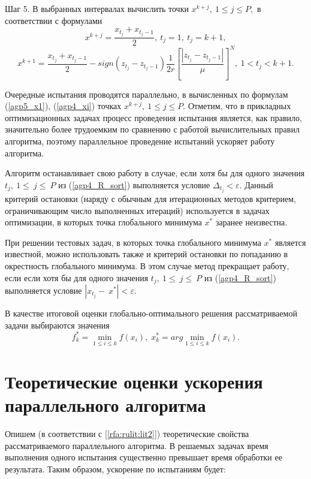 \documentclass[10pt,a4paper]{book}
\begin{document}
Шаг 5. В выбранных интервалах вычислить точки $x^{k+j},\ 1\leq j\leq P,$ в соответствии с формулами
\begin{equation}
\label{agp5_x1}
	x^{k+j}=\frac{x_{t_j}+x_{t_j-1}}{2},\ t_j=1,\ t_j=k+1,
\end{equation}	
	\begin{equation}
\label{agp4_xi}	
	x^{k+1}=\frac{x_{t_j}+x_{t_j-1}}{2}-sign\left(z_{t_j}-z_{t_j-1}\right)\frac{1}{2r}\left[\frac{\left|z_{t_j}-z_{t_j-1}\right|}{\mu}\right]^N,\ 1<t_j<k+1.
\end{equation}	

Очередные испытания проводятся параллельно, в вычисленных по формулам (\ref{agp5_x1}), (\ref{agp4_xi}) точках $x^{k+j},\ 1\leq j\leq P$.
Отметим, что в прикладных оптимизационных задачах процесс проведения испытания является, как правило, значительно более трудоемким по сравнению с работой вычислительных правил алгоритма, поэтому параллельное проведение испытаний ускоряет работу алгоритма.

Алгоритм останавливает свою работу в случае, если хотя бы для одного значения $t_j,\ 1\le\ j\le\ P$ из (\ref{agp4_R_sort}) выполняется условие \(\Delta_{t_j} < \varepsilon\). Данный критерий остановки (наряду с обычным для итерационных методов критерием, ограничивающим число выполненных итераций) используется в задачах оптимизации, в которых точка глобального минимума $x^*$ заранее неизвестна. 
	 
При решении тестовых задач, в которых точка глобального минимума $x^*$ является  известной, можно использовать также и критерий остановки по попаданию в окрестность глобального минимума. В этом случае метод прекращает работу, если если хотя бы для одного значения $t_j,\ 1\le\ j\le\ P$ из (\ref{agp4_R_sort}) выполняется условие $\left|x_{t_j}-\ x^\ast\right| < \varepsilon.$
	
В качестве итоговой оценки глобально-оптимального решения рассматриваемой задачи выбираются значения 
\begin{equation}
f_k^*=\min_{1\leqslant i \leqslant k}f(x_i), \; x_k^*=arg \min_{1\leqslant i \leqslant k}f(x_i).
\end{equation}


\section{Теоретические оценки ускорения параллельного алгоритма}

Опишем (в соответствии с [\ref{rfa:rulit:lit2}]) теоретические свойства рассматриваемого параллельного алгоритма. В решаемых задачах время выполнения одного испытания существенно превышает время обработки ее результата. Таким образом, ускорение по испытаниям будет:
\end{document}
